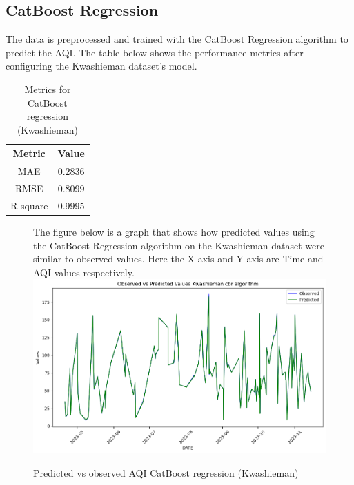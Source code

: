 \documentclass{book}
\numberwithin{equation}{section}
\numberwithin{figure}{section}
\begin{document}
\subsection{CatBoost  Regression}
The data is preprocessed and trained with the CatBoost Regression algorithm to predict the AQI. The table below shows the performance metrics after configuring the Kwashieman dataset's model.
\begin{table}[H]
    \centering
    \begin{tabular}{|c|c|}
        \hline
        \textbf{Metric} & \textbf{Value} \\
        \hline
        MAE & 0.2836 \\
        \hline
        RMSE & 0.8099\\
        \hline
        R-square & 0.9995\\
        \hline
    \end{tabular}
    \caption{ Metrics for CatBoost regression (Kwashieman)}
    \label{tab: CBR metrics (Kwashieman)}
\end{table}
\begin{figure}[H]
 \begin{minipage}{\linewidth}
        The figure below is a graph that shows how predicted values using the CatBoost Regression algorithm on the Kwashieman dataset were similar to observed values. Here the X-axis and Y-axis are Time and AQI values respectively.
        \vspace{0.5em} 
        \includegraphics[width=\linewidth]{kwashieman cbr.png}
       
        \caption{ Predicted vs observed AQI CatBoost regression (Kwashieman)}
        \label{fig: CBR predicted v observed (Kwashieman)}
    \end{minipage}
\end{figure}
\end{document}
